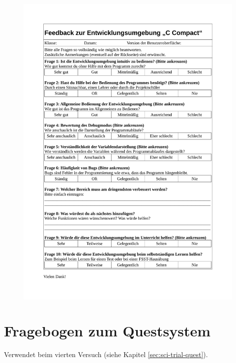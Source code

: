 \documentclass[11pt, oneside]{book}   		%
\begin{document}
\begin{figure}[h!]
	\centering
	\includegraphics[width=1.0\textwidth]{./media/docs/Fragebogen-gui.pdf}
	\label{fig:app-doc-fb-gui}
\end{figure}

\pagebreak
\section{Fragebogen zum Questsystem}
Verwendet beim vierten Versuch (siehe Kapitel \ref{sec:sci-trial-quest}).
\end{document}
